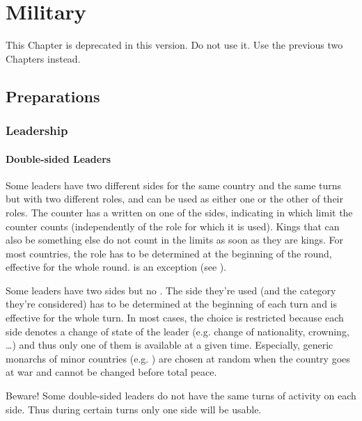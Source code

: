 \chapter{Military}\label{chapter:Military}

\begin{designnote}
  This Chapter is deprecated in this version. Do not use it. Use the
  previous two Chapters instead.
\end{designnote}

\section{Preparations}

\subsection{Leadership}\label{chMilitary:Leadership}
\subsubsection{Double-sided Leaders}\label{chMilitary:Double Sided Leaders}
\aparag Some leaders have two different sides for the same country and the
same turns but with two different roles, and can be used as either one or the
other of their roles.
\bparag The counter has a {\textetoile} written on one of the sides,
indicating in which limit the counter counts (independently of the role
for which it is used).
\bparag Kings that can also be something else do not count in the limits
as soon as they are kings.
\bparag For most countries, the role has to be determined at the
beginning of the round, effective for the whole round. \POR is an
exception (see ).

\aparag Some leaders have two sides but no {\textetoile}.
\bparag The side they're used (and the category they're considered) has
to be determined at the beginning of each turn and is effective for the
whole turn.
\bparag In most cases, the choice is restricted because each side
denotes a change of state of the leader (e.g. change of nationality,
crowning, \ldots) and thus only one of them is available at a given
time.
\bparag Especially, generic monarchs of minor countries
(e.g. \leaderShah) are chosen at random when the country goes at war and
cannot be changed before total peace.

\aparag Beware! Some double-sided leaders do not have the same turns of
activity on each side. Thus during certain turns only one side will be
usable.

